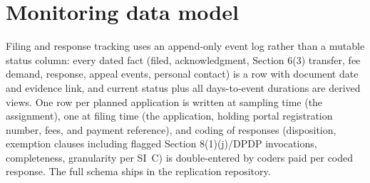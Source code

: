 \documentclass[11pt]{article}
\begin{document}
\section{Monitoring data model}
\label{si:monitoring}

Filing and response tracking uses an append-only event log rather than a mutable status column: every dated fact (filed, acknowledgment, Section 6(3) transfer, fee demand, response, appeal events, personal contact) is a row with document date and evidence link, and current status plus all days-to-event durations are derived views. One row per planned application is written at sampling time (the assignment), one at filing time (the application, holding portal registration number, fees, and payment reference), and coding of responses (disposition, exemption clauses including flagged Section 8(1)(j)/DPDP invocations, completeness, granularity per SI~C) is double-entered by coders paid per coded response. The full schema ships in the replication repository.
\end{document}
